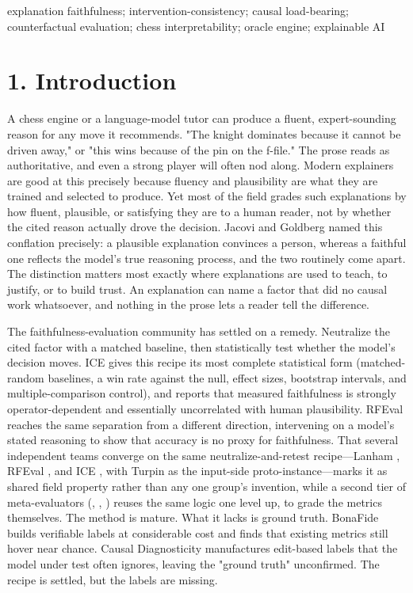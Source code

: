 \documentclass[conference]{IEEEtran}
\begin{document}
\begin{IEEEkeywords}
explanation faithfulness; intervention-consistency; causal load-bearing; counterfactual evaluation; chess interpretability; oracle engine; explainable AI
\end{IEEEkeywords}
\section*{1. Introduction}
A chess engine or a language-model tutor can produce a fluent, expert-sounding reason for any move it recommends. "The knight dominates because it cannot be driven away," or "this wins because of the pin on the f-file." The prose reads as authoritative, and even a strong player will often nod along. Modern explainers are good at this precisely because fluency and plausibility are what they are trained and selected to produce. Yet most of the field grades such explanations by how fluent, plausible, or satisfying they are to a human reader, not by whether the cited reason actually drove the decision. Jacovi and Goldberg \cite{ref30} named this conflation precisely: a plausible explanation convinces a person, whereas a faithful one reflects the model's true reasoning process, and the two routinely come apart. The distinction matters most exactly where explanations are used to teach, to justify, or to build trust. An explanation can name a factor that did no causal work whatsoever, and nothing in the prose lets a reader tell the difference.

The faithfulness-evaluation community has settled on a remedy. Neutralize the cited factor with a matched baseline, then statistically test whether the model's decision moves. ICE \cite{ref17} gives this recipe its most complete statistical form (matched-random baselines, a win rate against the null, effect sizes, bootstrap intervals, and multiple-comparison control), and reports that measured faithfulness is strongly operator-dependent and essentially uncorrelated with human plausibility. RFEval \cite{ref16} reaches the same separation from a different direction, intervening on a model's stated reasoning to show that accuracy is no proxy for faithfulness. That several independent teams converge on the same neutralize-and-retest recipe---Lanham \cite{ref29}, RFEval \cite{ref16}, and ICE \cite{ref17}, with Turpin \cite{ref28} as the input-side proto-instance---marks it as shared field property rather than any one group's invention, while a second tier of meta-evaluators (\cite{ref14}, \cite{ref15}, \cite{ref44}) reuses the same logic one level up, to grade the metrics themselves. The method is mature. What it lacks is ground truth. BonaFide \cite{ref14} builds verifiable labels at considerable cost and finds that existing metrics still hover near chance. Causal Diagnosticity \cite{ref15} manufactures edit-based labels that the model under test often ignores, leaving the "ground truth" unconfirmed. The recipe is settled, but the labels are missing.
\end{document}

